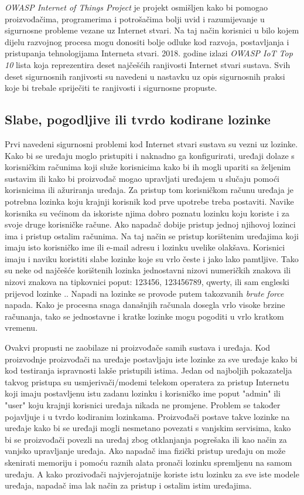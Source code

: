 \documentclass[times, utf8, diplomski]{fer}
\begin{document}
\emph{OWASP Internet of Things Project} je projekt osmišljen kako bi pomogao proizvođačima, programerima i potrošačima bolji uvid i razumijevanje u sigurnosne probleme vezane uz Internet stvari. Na taj način korisnici u bilo kojem dijelu razvojnog procesa mogu donositi bolje odluke kod razvoja, postavljanja i pristupanja tehnologijama Interneta stvari.\citep{owasp1} 2018. godine izlazi \emph{OWASP IoT Top 10} lista koja reprezentira deset najčešćih ranjivosti Internet stvari sustava. Svih deset sigurnosnih ranjivosti su navedeni u nastavku uz opis sigurnosnih praksi koje bi trebale spriječiti te ranjivosti i sigurnosne propuste. 

\subsection{Slabe, pogodljive ili tvrdo kodirane lozinke}
Prvi navedeni sigurnosni problemi kod Internet stvari sustava su vezni uz lozinke. Kako bi se uređaju moglo pristupiti i naknadno ga konfigurirati, uređaji dolaze s korisničkim računima koji služe korisnicima kako bi ih mogli upariti sa željenim sustavim ili kako bi proizvođač mogao upravljati uređajem u slučaju pomoći korisnicima ili ažuriranja uređaja. Za pristup tom korisničkom računu uređaja je potrebna lozinka koju krajnji korisnik kod prve upotrebe treba postaviti. Navike korisnika su većinom da iskoriste njima dobro poznatu lozinku koju koriste i za svoje druge korisničke račune. Ako napadač dobije pristup jednoj njihovoj lozinci ima i pristup ostalim računima. Na taj način se pristup korištenim uređajima koji imaju isto korisničko ime ili e-mail adresu i lozinku uvelike olakšava. Korisnici imaju i naviku koristiti slabe lozinke koje su vrlo česte i jako lako pamtljive. Tako su neke od najčešće korištenih lozinka jednostavni nizovi numeričkih znakova ili nizovi znakova na tipkovnici poput: 123456, 123456789, qwerty, ili sam engleski prijevod lozinke .\citep{pass1}. Napadi na lozinke se provode putem takozvanih \emph{brute force} napada. Kako je procesna snaga današnjih računala dosegla vrlo visoke brzine računanja, tako se jednostavne i kratke lozinke mogu pogoditi u vrlo kratkom vremenu.

Ovakvi propusti ne zaobilaze ni proizvođače samih sustava i uređaja. Kod proizvodnje proizvođači na uređaje postavljaju iste lozinke za sve uređaje kako bi kod testiranja ispravnosti lakše pristupili istima. Jedan od najboljih pokazatelja takvog pristupa su usmjerivači/modemi telekom operatera za pristup Internetu koji imaju postavljenu istu zadanu lozinku i korisničko ime poput "admin" ili "user" koju krajnji korisnici uređaja nikada ne promjene. Problem se također pojavljuje i u tvrdo kodiranim  lozinkama. Proizvođači postave takve lozinke na uređaje kako bi se uređaji mogli nesmetano povezati s vanjskim servisima, kako bi se proizvođači povezli na uređaj zbog otklanjanja pogrešaka ili kao način za vanjsko upravljanje uređaja. Ako napadač ima fizički pristup uređaju on može skenirati memoriju i pomoću raznih alata pronači lozinku spremljenu na samom uređaju. A kako prozivođači najvjerojatnije koriste istu lozinku za sve iste modele uređaja, napadač ima lak način za pristup i ostalim istim uređajima.
\end{document}
